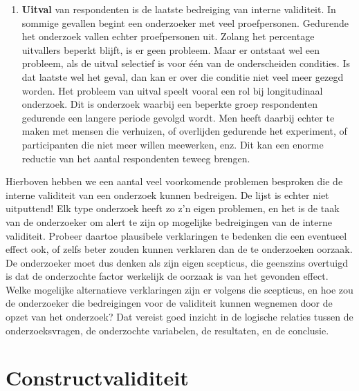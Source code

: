 \documentclass[
]{book}
\providecommand{\tightlist}{%
  \setlength{\itemsep}{0pt}\setlength{\parskip}{0pt}}
\begin{document}
\begin{enumerate}
\def\labelenumi{\arabic{enumi}.}
\setcounter{enumi}{5}
\tightlist
\item
  \textbf{Uitval} van respondenten is de laatste bedreiging van interne
  validiteit. In sommige gevallen begint een onderzoeker met veel
  proefpersonen. Gedurende het onderzoek vallen echter proefpersonen uit.
  Zolang het percentage uitvallers beperkt blijft, is er geen probleem.
  Maar er ontstaat wel een probleem, als de uitval selectief is voor één
  van de onderscheiden condities. Is dat laatste wel het geval, dan kan er
  over die conditie niet veel meer gezegd worden. Het probleem van uitval
  speelt vooral een rol bij longitudinaal onderzoek. Dit is onderzoek
  waarbij een beperkte groep respondenten gedurende een langere periode
  gevolgd wordt. Men heeft daarbij echter te maken met mensen die
  verhuizen, of overlijden gedurende het experiment, of participanten die
  niet meer willen meewerken, enz. Dit kan een enorme reductie van het
  aantal respondenten teweeg brengen.
\end{enumerate}

Hierboven hebben we een aantal veel voorkomende problemen besproken die
de interne validiteit van een onderzoek kunnen bedreigen. De lijst is
echter niet uitputtend! Elk type onderzoek heeft zo z'n eigen problemen,
en het is de taak van de onderzoeker om alert te zijn op mogelijke
bedreigingen van de interne validiteit. Probeer daartoe plausibele
verklaringen te bedenken die een eventueel effect ook, of zelfs beter
zouden kunnen verklaren dan de te onderzoeken oorzaak. De onderzoeker
moet dus denken als zijn eigen scepticus, die geenszins overtuigd is dat
de onderzochte factor werkelijk de oorzaak is van het gevonden effect.
Welke mogelijke alternatieve verklaringen zijn er volgens die scepticus,
en hoe zou de onderzoeker die bedreigingen voor de validiteit kunnen
wegnemen door de opzet van het onderzoek? Dat vereist goed inzicht in de
logische relaties tussen de onderzoeksvragen, de onderzochte variabelen,
de resultaten, en de conclusie.

\hypertarget{sec:constructvaliditeit}{%
\section{Constructvaliditeit}\label{sec:constructvaliditeit}}
\end{document}
